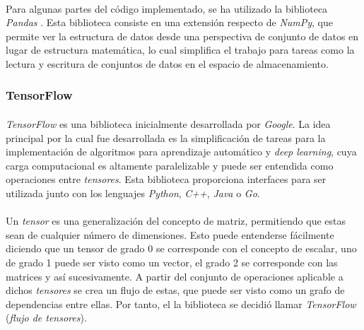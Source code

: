 \documentclass{subfiles}
\begin{document}
          \paragraph{}
          Para algunas partes del código implementado, se ha utilizado la biblioteca \emph{Pandas} \cite{mckinney2010data}. Esta biblioteca consiste en una extensión respecto de \emph{NumPy}, que permite ver la estructura de datos desde una perspectiva de conjunto de datos en lugar de estructura matemática, lo cual simplifica el trabajo para tareas como la lectura y escritura de conjuntos de datos en el espacio de almacenamiento.

        \subsubsection{TensorFlow}
        \label{sec:tensorflow}

          \paragraph{}
          \emph{TensorFlow} \cite{abadi2016tensorflow} es una biblioteca inicialmente desarrollada por \emph{Google}. La idea principal por la cual fue desarrollada es la simplificación de tareas para la implementación de algoritmos para aprendizaje automático y \emph{deep learning}, cuya carga computacional es altamente paralelizable y puede ser entendida como operaciones entre \emph{tensores}. Esta biblioteca proporciona interfaces para ser utilizada junto con los lenguajes \emph{Python}, \emph{C++}, \emph{Java} o \emph{Go}.

          \paragraph{}
          Un \emph{tensor} es una generalización del concepto de matriz, permitiendo que estas sean de cualquier número de dimensiones. Esto puede entenderse fácilmente diciendo que un tensor de grado 0 se corresponde con el concepto de escalar, uno de grado 1 puede ser visto como un vector, el grado 2 se corresponde con las matrices y así sucesivamente. A partir del conjunto de operaciones aplicable a dichos \emph{tensores} se crea un flujo de estas, que puede ser visto como un grafo de dependencias entre ellas. Por tanto, el la biblioteca se decidió llamar \emph{TensorFlow} (\emph{flujo de tensores}).
\end{document}
